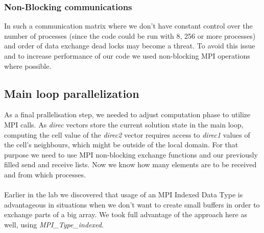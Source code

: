 \documentclass{article}
\begin{document}
\subsubsection{Non-Blocking communications}
In such a communication matrix where we don't have constant control over the number of processes (since the code could be run with 8, 256 or more processes) and order of data exchange dead locks may become a threat. To avoid this issue and to increase performance of our code we used non-blocking MPI operations where possible.

\subsection{Main loop parallelization}
As a final prallelisation step, we needed to adjust computation phase to utilize MPI calls. As \textit{direc} vectors store the current solution state in the main loop, computing the cell value of the \textit{direc2} vector requires access to \textit{direc1} values of the cell’s neighbours, which might be outside of the local domain. For that purpose we need to use MPI non-blocking exchange functions and our previously filled send and receive lists. Now we know how many elements are to be received and from which processes.
\\\\
Earlier in the lab we discovered that usage of an MPI Indexed Data Type is advantageous in situations when we don't want to create small buffers in order to exchange parts of a big array. We took full advantage of the approach here as well, using \textit{MPI\_Type\_indexed}.
\end{document}
